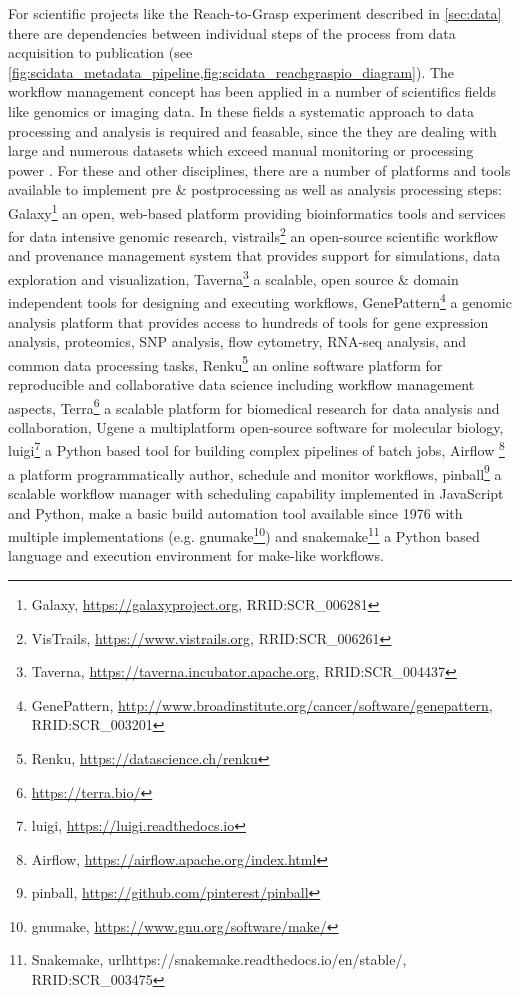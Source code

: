 For scientific projects like the Reach-to-Grasp experiment described in \cref{sec:data} there are dependencies between individual steps of the process from data acquisition to publication (see \cref{fig:scidata_metadata_pipeline,fig:scidata_reachgraspio_diagram}). The workflow management concept has been applied in a number of scientifics fields like genomics or imaging data. In these fields a systematic approach to data processing and analysis is required and feasable, since the they are dealing with large and numerous datasets which exceed manual monitoring or processing power \citep[e.g.][]{Palm_2010}.
For these and other disciplines, there are a number of platforms and tools available to implement pre \& postprocessing as well as analysis processing steps: Galaxy\footnote{Galaxy, \url{https://galaxyproject.org}, RRID:SCR\_006281} an  open, web-based platform providing bioinformatics tools and services for data intensive genomic research, vistrails\footnote{VisTrails, \url{https://www.vistrails.org}, RRID:SCR\_006261} an open-source scientific workflow and provenance management system that provides support for simulations, data exploration and visualization, Taverna\footnote{Taverna, \url{https://taverna.incubator.apache.org}, RRID:SCR\_004437} a scalable, open source \& domain independent tools for designing and executing workflows,  GenePattern\footnote{GenePattern, \url{http://www.broadinstitute.org/cancer/software/genepattern}, RRID:SCR\_003201} a genomic analysis platform that provides access to hundreds of tools for gene expression analysis, proteomics, SNP analysis, flow cytometry, RNA-seq analysis, and common data processing tasks, Renku\footnote{Renku, \url{https://datascience.ch/renku}} an online software platform for reproducible and collaborative data science including workflow management aspects, Terra\footnote{\url{https://terra.bio/}} a scalable platform  for biomedical research for data analysis and collaboration, Ugene \citep{Okonechnikov_2012} a multiplatform open-source software for molecular biology, luigi\footnote{luigi, \url{https://luigi.readthedocs.io}} a Python based tool for building complex pipelines of batch jobs, Airflow \footnote{Airflow, \url{https://airflow.apache.org/index.html}} a platform programmatically author, schedule and monitor workflows, pinball\footnote{pinball, \url{https://github.com/pinterest/pinball}} a scalable workflow manager with scheduling capability implemented in JavaScript and Python, make a basic build automation tool available since 1976 with multiple implementations (e.g. gnumake\footnote{gnumake, \url{https://www.gnu.org/software/make/}}) and snakemake\footnote{Snakemake, url{https://snakemake.readthedocs.io/en/stable/}, RRID:SCR\_003475} a Python based language and execution environment for make-like workflows.

